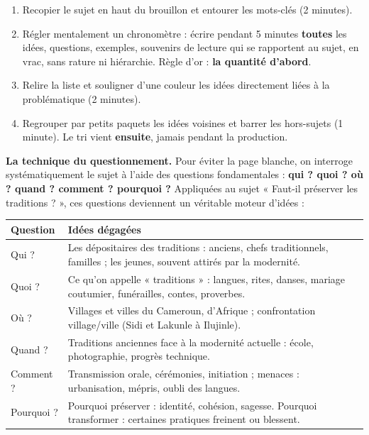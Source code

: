\documentclass[11pt]{article}
\begin{document}
\begin{methode}
\begin{enumerate}
\item Recopier le sujet en haut du brouillon et entourer les mots-clés (2 minutes).
\item Régler mentalement un chronomètre : écrire pendant 5 minutes \textbf{toutes} les idées, questions, exemples, souvenirs de lecture qui se rapportent au sujet, en vrac, sans rature ni hiérarchie. Règle d'or : \textbf{la quantité d'abord}.
\item Relire la liste et souligner d'une couleur les idées directement liées à la problématique (2 minutes).
\item Regrouper par petits paquets les idées voisines et barrer les hors-sujets (1 minute). Le tri vient \textbf{ensuite}, jamais pendant la production.
\end{enumerate}
\end{methode}

\textbf{La technique du questionnement.} Pour éviter la page blanche, on interroge systématiquement le sujet à l'aide des questions fondamentales : \textbf{qui ? quoi ? où ? quand ? comment ? pourquoi ?} Appliquées au sujet « Faut-il préserver les traditions ? », ces questions deviennent un véritable moteur d'idées :

\begin{center}
\begin{tabularx}{\linewidth}{|l|X|}
\hline
\rowcolor{popblueL} \textbf{Question} & \textbf{Idées dégagées} \\
\hline
Qui ? & Les dépositaires des traditions : anciens, chefs traditionnels, familles ; les jeunes, souvent attirés par la modernité. \\
\hline
Quoi ? & Ce qu'on appelle « traditions » : langues, rites, danses, mariage coutumier, funérailles, contes, proverbes. \\
\hline
Où ? & Villages et villes du Cameroun, d'Afrique ; confrontation village/ville (Sidi et Lakunle à Ilujinle). \\
\hline
Quand ? & Traditions anciennes face à la modernité actuelle : école, photographie, progrès technique. \\
\hline
Comment ? & Transmission orale, cérémonies, initiation ; menaces : urbanisation, mépris, oubli des langues. \\
\hline
Pourquoi ? & Pourquoi préserver : identité, cohésion, sagesse. Pourquoi transformer : certaines pratiques freinent ou blessent. \\
\hline
\end{tabularx}
\end{center}
\end{document}

